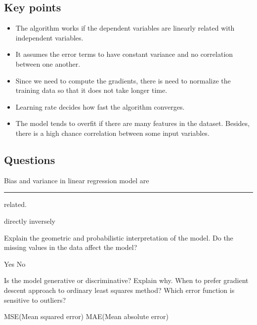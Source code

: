 \documentclass[12pt,letterpaper, onecolumn]{exam}
\begin{document}
\subsection*{Key points}
\begin{itemize}
\item The algorithm works if the dependent variables are linearly related with independent variables.
\item It assumes the error terms to have constant variance and no correlation between one another.
\item Since we need to compute the gradients, there is need to normalize the training data so that it does not take longer time.
\item Learning rate decides how fast the algorithm converges.
\item The model tends to overfit if there are many features in the dataset. Besides, there is a high chance correlation between some input variables.
\end{itemize}

\subsection*{Questions}

\begin{questions}
\question[] Bias and variance in linear regression model are \rule{2cm}{0.15mm} related.\\
\begin{oneparchoices}
    \choice directly
    \choice inversely
  \end{oneparchoices} 
  \question[] Explain the geometric and probabilistic interpretation of the model.
  \question[] Do the missing values in the data affect the model?\\
  \begin{oneparchoices}
    \choice Yes
    \choice No
  \end{oneparchoices} 
  \question[] Is the model generative or discriminative? Explain why.
  \question[] When to prefer gradient descent approach to ordinary least squares method?
  \question[] Which error function is sensitive to outliers?
  \begin{choices}
  \choice MSE(Mean squared error)
  \choice MAE(Mean absolute error)
  \end{choices}
\end{questions}
\end{document}
